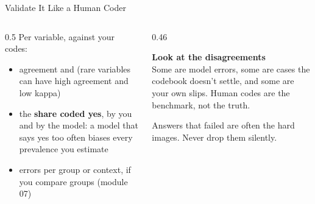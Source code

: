\begin{frame}{Validate It Like a Human Coder}
\begin{columns}[T]
\begin{column}{0.5\textwidth}
Per variable, against your codes:
\begin{itemize}
\item agreement and  (rare variables can have high agreement and low kappa)
\item the \textbf{share coded yes}, by you and by the model: a model that says yes too often
      biases every prevalence you estimate
\item errors per group or context, if you compare groups (module 07)
\end{itemize}
\end{column}
\begin{column}{0.46\textwidth}
\begin{greenbox}
\textbf{Look at the disagreements}\\
Some are model errors, some are cases the codebook doesn't settle, and some are your own slips.
Human codes are the benchmark, not the truth.
\end{greenbox}
\begin{warnbox}
Answers that failed are often the hard images. Never drop them silently.
\end{warnbox}
\end{column}
\end{columns}
\end{frame}

